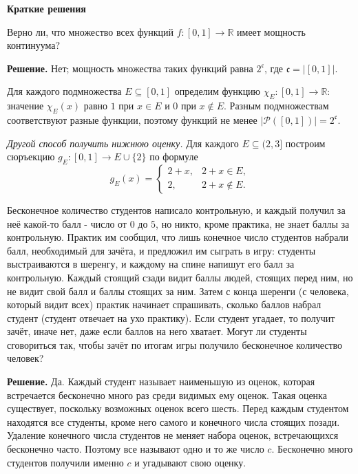 

\ifPDFTeX
  \renewcommand{\rmdefault}{cmr}
\fi

\def\SheetNo{3}
\setlength{\emergencystretch}{2em}


\begin{center}\textbf{Краткие решения}\end{center}

\begin{problems}

\item Верно ли, что множество всех функций $f\colon[0,1]\to\mathbb R$ имеет мощность континуума?
\par\smallskip\noindent\textbf{Решение.} Нет; мощность множества таких функций равна $2^{\mathfrak c}$, где $\mathfrak c=|[0,1]|$.
\par Для каждого подмножества $E\subseteq[0,1]$ определим функцию $\chi_E\colon[0,1]\to\mathbb R$: значение $\chi_E(x)$ равно $1$ при $x\in E$ и $0$ при $x\notin E$. Разным подмножествам соответствуют разные функции, поэтому функций не менее $|\mathcal P([0,1])|=2^{\mathfrak c}$.
\par\textit{Другой способ получить нижнюю оценку.} Для каждого $E\subseteq(2,3]$ построим сюръекцию $g_E\colon[0,1]\to E\cup\{2\}$ по формуле
\[
g_E(x)=
\begin{cases}
2+x,&2+x\in E,\\
2,&2+x\notin E.
\end{cases}
\]

\item Бесконечное количество студентов написало контрольную, и каждый получил за неё какой-то балл - число от $0$ до $5$, но никто, кроме практика, не знает баллы за контрольную. Практик им сообщил, что лишь конечное число студентов набрали балл, необходимый для зачёта, и предложил им сыграть в игру: студенты выстраиваются в шеренгу, и каждому на спине напишут его балл за контрольную. Каждый стоящий сзади видит баллы людей, стоящих перед ним, но не видит свой балл и баллы стоящих за ним. Затем с конца шеренги (с человека, который видит всех) практик начинает спрашивать, сколько баллов набрал студент (студент отвечает на ухо практику). Если студент угадает, то получит зачёт, иначе нет, даже если баллов на него хватает. Могут ли студенты сговориться так, чтобы зачёт по итогам игры получило бесконечное количество человек?
\par\smallskip\noindent\textbf{Решение.} Да. Каждый студент называет наименьшую из оценок, которая встречается бесконечно много раз среди видимых ему оценок. Такая оценка существует, поскольку возможных оценок всего шесть. Перед каждым студентом находятся все студенты, кроме него самого и конечного числа стоящих позади. Удаление конечного числа студентов не меняет набора оценок, встречающихся бесконечно часто. Поэтому все называют одно и то же число $c$. Бесконечно много студентов получили именно $c$ и угадывают свою оценку.\par


\end{problems}
